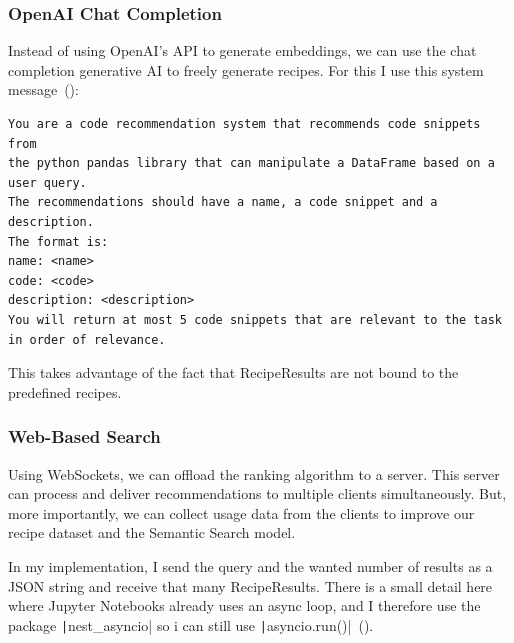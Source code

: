 \documentclass[
     12pt,                    %
     a4paper,             %
     BCOR=10mm,     %
     DIV=14,                 %
     listof=totoc,                    %
     bibliography=totoc,       %
     index=totoc,              %
     twoside,
     headsepline
     ]{scrreprt}
\begin{document}
\subsubsection{OpenAI Chat Completion}\label{chatcompletion}

Instead of using OpenAI's API to generate embeddings, we can use the chat completion generative AI to freely generate recipes. For this I use this system message~():

\begin{listing}[htb]
	\begin{verbatim}
You are a code recommendation system that recommends code snippets from
the python pandas library that can manipulate a DataFrame based on a user query.
The recommendations should have a name, a code snippet and a description.
The format is:
name: <name>
code: <code>
description: <description>
You will return at most 5 code snippets that are relevant to the task
in order of relevance.
	\end{verbatim}
	\caption[OpenAI System Message]{OpenAI System Message.\label{list:systemmessage}}
\end{listing}

This takes advantage of the fact that RecipeResults are not bound to the predefined recipes.

\subsubsection{Web-Based Search}

Using WebSockets, we can offload the ranking algorithm to a server. This server can process and deliver recommendations to multiple clients simultaneously. But, more importantly, we can collect usage data from the clients to improve our recipe dataset and the Semantic Search model.

In my implementation, I send the query and the wanted number of results as a JSON string and receive that many RecipeResults. There is a small detail here where Jupyter Notebooks already uses an async loop, and I therefore use the package \texttt|nest_asyncio| so i can still use \texttt|asyncio.run()|~().
\end{document}
